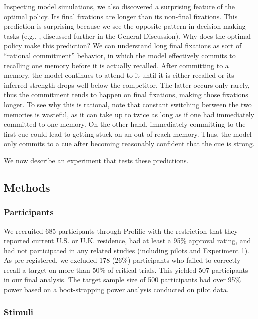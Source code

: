 Inspecting model simulations, we also discovered a surprising feature of the optimal policy. Its final fixations are longer than its non-final fixations. This prediction is surprising because we see the opposite pattern in decision-making tasks (e.g., \citealp{krajbich2010visual}, discussed further in the General Discussion). Why does the optimal policy make this prediction? We can understand long final fixations as sort of ``rational commitment'' behavior, in which the model effectively commits to recalling one memory before it is actually recalled. After committing to a memory, the model continues to attend to it until it is either recalled or its inferred strength drops well below the competitor. The latter occurs only rarely, thus the commitment tends to happen on final fixations, making those fixations longer. To see why this is rational, note that constant switching between the two memories is wasteful, as it can take up to twice as long as if one had immediately committed to one memory. On the other hand, immediately committing to the first cue could lead to getting stuck on an out-of-reach memory. Thus, the model only commits to a cue after becoming reasonably confident that the cue is strong.

We now describe an experiment that tests these predictions.

\subsection{Methods}

\subsubsection{Participants}

We recruited 685 participants through Prolific with the restriction that they reported current U.S. or U.K. residence, had at least a 95\% approval rating, and had not participated in any related studies (including pilots and Experiment 1). As pre-registered, we excluded 178 (26\%) participants who failed to correctly recall a target on more than 50\% of critical trials. This yielded 507 participants in our final analysis. The target sample size of 500 participants had over 95\% power based on a boot-strapping power analysis conducted on pilot data.

\subsubsection{Stimuli}

